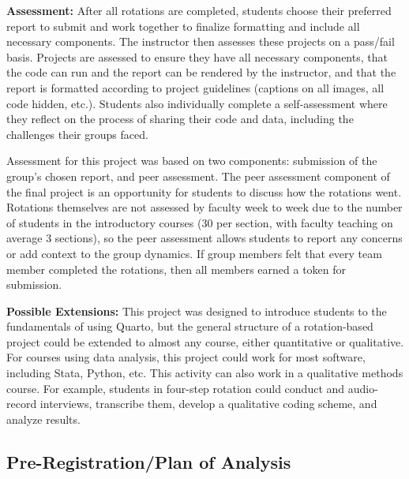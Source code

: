 \documentclass[
  12pt]{article}
\begin{document}
\textbf{Assessment:} After all rotations are completed, students choose their preferred report to submit and work together to finalize formatting and include all necessary components. The instructor then assesses these projects on a pass/fail basis. 
Projects are assessed to ensure they have all necessary components, that the code can run and the report can be rendered by the instructor, and that the report is formatted according to project guidelines (captions on all images, all code hidden, etc.). 
Students also individually complete a self-assessment where they reflect on the process of sharing their code and data, including the challenges their groups faced. 

Assessment for this project was based on two components: submission of the group’s chosen report, and peer assessment. The peer assessment component of the final project is an opportunity for students to discuss how the rotations went. Rotations themselves are not assessed by faculty week to week due to the number of students in the introductory courses (30 per section, with faculty teaching on average 3 sections), so the peer assessment allows students to report any concerns or add context to the group dynamics. If group members felt that every team member completed the rotations, then all members earned a token for submission. 


\textbf{Possible Extensions:}
This project was designed to introduce students to the fundamentals of using Quarto, but the general structure of a rotation-based project could be extended to almost any course, either quantitative or qualitative. 
For courses using data analysis, this project could work for most software, including Stata, Python, etc. 
This activity can also work in a qualitative methods course.
For example, students in four-step rotation could conduct and audio-record interviews, transcribe them, develop a qualitative coding scheme, and analyze results.

\subsection{Pre-Registration/Plan of Analysis} \label{sec-preregistration}
\end{document}
